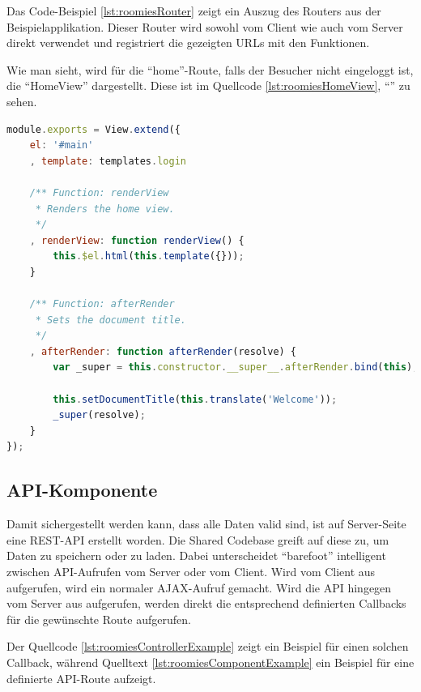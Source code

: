 Das Code-Beispiel \ref{lst:roomiesRouter} zeigt ein Auszug des Routers aus der Beispielapplikation.
Dieser Router wird sowohl vom Client wie auch vom Server direkt verwendet und registriert die gezeigten URLs mit den Funktionen.

Wie man sieht, wird für die ``home''-Route, falls der Besucher nicht eingeloggt ist,
die ``HomeView'' dargestellt. Diese ist im Quellcode \ref{lst:roomiesHomeView}, ``'' zu sehen.

\begin{lstlisting}[language=JavaScript, caption=Router der Beispielapplikation, label=lst:roomiesHomeView]
module.exports = View.extend({
	el: '#main'
	, template: templates.login

	/** Function: renderView
	 * Renders the home view.
	 */
	, renderView: function renderView() {
		this.$el.html(this.template({}));
	}

	/** Function: afterRender
	 * Sets the document title.
	 */
	, afterRender: function afterRender(resolve) {
		var _super = this.constructor.__super__.afterRender.bind(this);

		this.setDocumentTitle(this.translate('Welcome'));
		_super(resolve);
	}
});
\end{lstlisting}

\subsection{API-Komponente}
Damit sichergestellt werden kann, dass alle Daten valid sind, ist auf Server-Seite
eine REST-API \cite{REST} erstellt worden. Die Shared Codebase greift auf diese zu, um
Daten zu speichern oder zu laden.
Dabei unterscheidet ``barefoot'' intelligent zwischen API-Aufrufen vom Server oder vom Client.
Wird vom Client aus aufgerufen, wird ein normaler AJAX-Aufruf gemacht. Wird die API
hingegen vom Server aus aufgerufen, werden direkt die entsprechend definierten
Callbacks für die gewünschte Route aufgerufen.

Der Quellcode \ref{lst:roomiesControllerExample} zeigt ein Beispiel für einen solchen
Callback, während Quelltext \ref{lst:roomiesComponentExample} ein Beispiel für
eine definierte API-Route aufzeigt.

